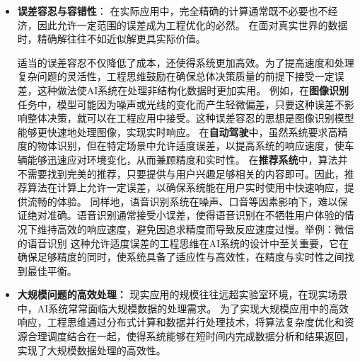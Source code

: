 \begin{itemize}
\item {\bf 误差容忍与容错性}：
在实际应用中，完全精确的计算通常既不必要也不经济，因此允许一定范围的误差成为工程优化的必然。
在面对真实世界的数据时，精确解往往不如近似解更具实际价值。


适当的误差容忍不仅降低了成本，还使得系统更加高效。为了提高速度和处理复杂问题的灵活性，工程思维鼓励在确保总体决策质量的前提下接受一定误差，这种做法使AI系统在处理非结构化数据时更加实用。
例如，在{\bf 图像识别}任务中，模型可能因为噪声或光线的变化而产生轻微偏差，只要这种误差不影响整体决策，就可以在工程应用中接受。这种误差容忍的思想是图像识别模型能够更快速地处理图像，实现实时响应。
在{\bf 自动驾驶}中，虽然系统要求高精度的物体识别，但在特定场景中允许适度误差，以提高系统的响应速度，使车辆能够迅速应对环境变化，从而兼顾精度和实时性。
在{\bf 推荐系统}中，算法并不需要找到完美的推荐，只要提供与用户兴趣足够相关的内容即可。因此，推荐算法在计算上允许一定误差，以确保系统能在用户实时使用中快速响应，提供流畅的体验。
同样地，语音识别系统在噪声、口音等因素影响下，难以保证绝对准确。语音识别通常接受小误差，使得语音识别在不牺牲用户体验的情况下维持高效的响应速度，避免因追求精度而导致反应速度过慢。{举例：微信的语音识别}
这种允许适度误差的工程思维在AI系统的设计中至关重要，它在确保足够精度的同时，使系统具备了适应性与高效性，在精度与实时性之间找到最佳平衡。
\item {\bf 大规模问题的高效处理：}
现实应用的规模往往远超实验室环境，在现实场景中，AI系统常常面临大规模数据的处理需求。
为了实现大规模应用中的高效响应，工程思维通过分布式计算和数据并行处理技术，将算法复杂度优化和资源合理调度结合在一起，使得系统能够在短时间内完成数据分析和结果返回，实现了大规模数据处理的高效性。


\end{itemize}
